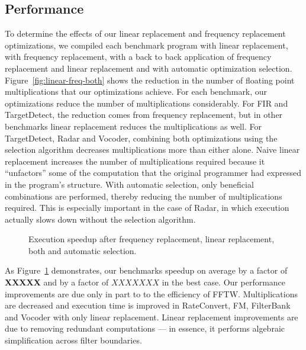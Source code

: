 \subsection{Performance}
To determine the effects of our linear replacement and frequency
replacement optimizations, we compiled each benchmark program with
linear replacement, with frequency replacement, with a back to back
application of frequency replacement and linear replacement and with
automatic optimization selection. Figure~\ref{fig:linear-freq-both}
shows the reduction in the number of floating point multiplications
that our optimizations achieve.  For each benchmark, our optimizations
reduce the number of multiplications considerably. For FIR and
TargetDetect, the reduction comes from frequency replacement, but in
other benchmarks linear replacement reduces the multiplications as
well. For TargetDetect, Radar and Vocoder, combining both
optimizations using the selection algorithm decreases multiplications
more than either alone. Naive linear replacement increases the number
of multiplications required because it ``unfactors'' some of the
computation that the original programmer had expressed in the
program's structure. With automatic selection, only beneficial
combinations are performed, thereby reducing the number of
multiplications required.  This is especially important in the case of
Radar, in which execution actually slows down without the selection
algorithm.

\begin{figure}[t]
\center
\epsfxsize=3.2in
\vspace{-6pt}
\caption{Execution speedup after 
  frequency replacement, linear replacement, both 
  and automatic selection.}
\label{fig:execution-speedup}
\vspace{-6pt}
\end{figure}


As Figure~\ref{fig:execution-speedup} demonstrates, our benchmarks
speedup on average by a factor of {\bf XXXXX} and by a factor of
$XXXXXXX$ in the best case.  Our performance improvements are due only
in part to to the efficiency of FFTW.  Multiplications are decreased
and execution time is improved in RateConvert, FM, FilterBank and
Vocoder with only linear replacement. Linear replacement improvements
are due to removing redundant computations --- in essence, it performs
algebraic simplification across filter boundaries.

